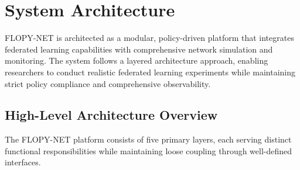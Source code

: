 \section{System Architecture}
\label{sec:system-architecture}

FLOPY-NET is architected as a modular, policy-driven platform that integrates federated learning capabilities with comprehensive network simulation and monitoring. The system follows a layered architecture approach, enabling researchers to conduct realistic federated learning experiments while maintaining strict policy compliance and comprehensive observability.

\subsection{High-Level Architecture Overview}

The FLOPY-NET platform consists of five primary layers, each serving distinct functional responsibilities while maintaining loose coupling through well-defined interfaces.

